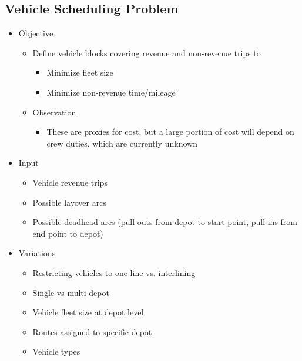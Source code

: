 \documentclass[11pt]{article}
\begin{document}
\subsection{Vehicle Scheduling Problem}
\label{sec:org08ccfe8}
\begin{itemize}
\item Objective
\begin{itemize}
\item Define vehicle blocks covering revenue and non-revenue trips to
\begin{itemize}
\item Minimize fleet size
\item Minimize non-revenue time/mileage
\end{itemize}
\item Observation
\begin{itemize}
\item These are proxies for cost, but a large portion of cost will depend on crew duties, which are currently unknown
\end{itemize}
\end{itemize}
\item Input
\begin{itemize}
\item Vehicle revenue trips
\item Possible layover arcs
\item Possible deadhead arcs (pull-outs from depot to start point, pull-ins from end point to depot)
\end{itemize}
\item Variations
\begin{itemize}
\item Restricting vehicles to one line vs. interlining
\item Single vs multi depot
\item Vehicle fleet size at depot level
\item Routes assigned to specific depot
\item Vehicle types
\end{itemize}
\end{itemize}
\end{document}
